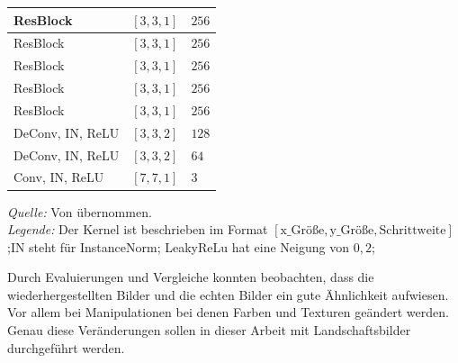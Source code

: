\begin{table}[]
\begin{center}
\begin{minipage}{.5\linewidth}
\begin{tabular}{lcl}
 				\midrule
 				ResBlock & $[3,3,1]$& $256$ \\
 				\midrule
 				ResBlock & $[3,3,1]$& $256$ \\
 				\midrule
 				ResBlock & $[3,3,1]$& $256$ \\
 				\midrule
 				ResBlock & $[3,3,1]$& $256$ \\
 				\midrule
 				ResBlock & $[3,3,1]$& $256$ \\
 				\midrule
 				DeConv, IN, ReLU & $[3,3,2]$ & $128$\\
 				\midrule
 				DeConv, IN, ReLU & $[3,3,2]$ & $64$\\
 				\midrule
 				Conv, IN, ReLU & $[7,7,1]$ & $3$\\
 				\bottomrule
 			\end{tabular}
 		\end{minipage} 
 	\end{center}
 	\begin{center}
 		\bigskip
 		\emph{Quelle:} Von \cite{zhu2017unpaired} übernommen.\\
 		\emph{Legende:} Der Kernel ist beschrieben im Format $[\text{x\_Größe},
 		\text{y\_Größe}, \text{Schrittweite}]$;IN steht für InstanceNorm; LeakyReLu hat eine Neigung von $0,2$;
 	\end{center}
 \end{table}
 
 
 Durch Evaluierungen und Vergleiche konnten \citeauthor{zhu2017unpaired} beobachten, dass die wiederhergestellten Bilder und die echten Bilder ein gute Ähnlichkeit aufwiesen. Vor allem bei Manipulationen bei denen Farben und Texturen geändert werden. Genau diese Veränderungen sollen in dieser Arbeit mit Landschaftsbilder durchgeführt werden. 
 
